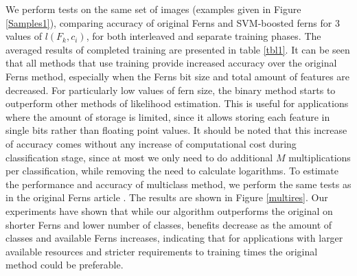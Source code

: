 \documentclass[10pt,twocolumn, a4paper]{article}
\begin{document}
We perform tests on the same set of images (examples given in Figure \ref{Samples1}), comparing accuracy of original Ferns and SVM-boosted ferns for 3 values of $l(F_k,c_i)$, for both interleaved and separate training phases. The averaged results of completed training are presented in table \ref{tbl1}.  It can be seen that all methods that use training provide increased accuracy over the original Ferns method, especially when the Ferns bit size and total amount of features are decreased. For particularly low values of fern size, the binary method starts to outperform other methods of likelihood estimation. This is useful for applications where the amount of storage is limited, since it allows storing each feature in single bits rather than floating point values. It should be noted that this increase of accuracy comes without any increase of computational cost during classification stage, since at most we only need to do additional $M$ multiplications per classification, while removing the need to calculate logarithms. 
To estimate the performance and accuracy of multiclass method, we perform the same tests as in the original Ferns article \cite{Ferns1}. The results are shown in Figure \ref{multires}. Our experiments have shown that while our algorithm outperforms the original on shorter Ferns and lower number of classes, benefits decrease as the amount of classes and available Ferns increases, indicating that for applications with larger available resources and stricter requirements to training times the original method could be preferable.
\end{document}
